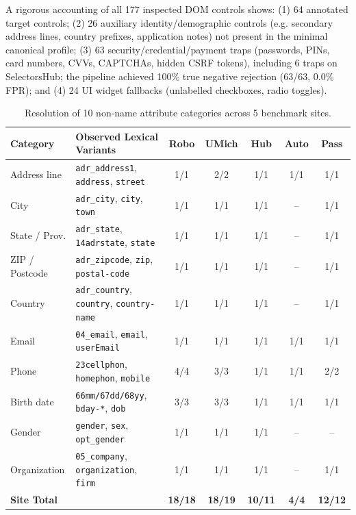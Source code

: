 \documentclass[runningheads,a4paper]{llncs}
\begin{document}
A rigorous accounting of all 177 inspected DOM controls shows: (1) 64 annotated target controls; (2) 26 auxiliary identity/demographic controls (e.g. secondary address lines, country prefixes, application notes) not present in the minimal canonical profile; (3) 63 security/credential/payment traps (passwords, PINs, card numbers, CVVs, CAPTCHAs, hidden CSRF tokens), including 6 traps on SelectorsHub; the pipeline achieved 100\% true negative rejection (63/63, 0.0\% FPR); and (4) 24 UI widget fallbacks (unlabelled checkboxes, radio toggles).

\begin{table}[t]
\caption{Resolution of 10 non-name attribute categories across 5 benchmark sites.}
\label{tab:cat}
\centering
\scriptsize
\setlength{\tabcolsep}{4pt}
\begin{tabular}{l l c c c c c}
\toprule
\textbf{Category} & \textbf{Observed Lexical Variants} & \textbf{Robo} & \textbf{UMich} & \textbf{Hub} & \textbf{Auto} & \textbf{Pass} \\
\midrule
Address line & \texttt{adr\_address1}, \texttt{address}, \texttt{street} & 1/1 & 2/2 & 1/1 & 1/1 & 1/1 \\
City & \texttt{adr\_city}, \texttt{city}, \texttt{town} & 1/1 & 1/1 & 1/1 & -- & 1/1 \\
State / Prov. & \texttt{adr\_state}, \texttt{14adrstate}, \texttt{state} & 1/1 & 1/1 & 1/1 & -- & 1/1 \\
ZIP / Postcode & \texttt{adr\_zipcode}, \texttt{zip}, \texttt{postal-code} & 1/1 & 1/1 & 1/1 & -- & 1/1 \\
Country & \texttt{adr\_country}, \texttt{country}, \texttt{country-name} & 1/1 & 1/1 & 1/1 & -- & 1/1 \\
Email & \texttt{04\_email}, \texttt{email}, \texttt{userEmail} & 1/1 & 1/1 & 1/1 & 1/1 & 1/1 \\
Phone & \texttt{23cellphon}, \texttt{homephon}, \texttt{mobile} & 4/4 & 3/3 & 1/1 & 1/1 & 2/2 \\
Birth date & \texttt{66mm/67dd/68yy}, \texttt{bday-*}, \texttt{dob} & 3/3 & 3/3 & 1/1 & 1/1 & 1/1 \\
Gender & \texttt{gender}, \texttt{sex}, \texttt{opt\_gender} & 1/1 & 1/1 & 1/1 & -- & -- \\
Organization & \texttt{05\_company}, \texttt{organization}, \texttt{firm} & 1/1 & 1/1 & 1/1 & -- & 1/1 \\
\midrule
\textbf{Site Total} & & \textbf{18/18} & \textbf{18/19} & \textbf{10/11} & \textbf{4/4} & \textbf{12/12} \\
\bottomrule
\end{tabular}
\end{table}
\end{document}
